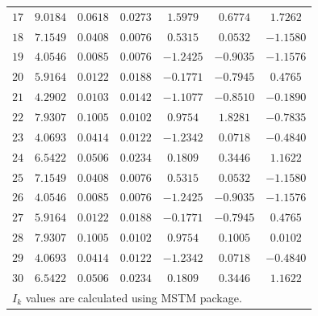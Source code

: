 \documentclass[final, 3p]{elsarticle}
\begin{document}
\begin{table}[h]
\begin{center}
\begin{tabular}{|c|c|c|c|c|c|c|}
$17$ & $9.0184$ & $0.0618$ & $0.0273$ & $ 1.5979$ & $ 0.6774$ & $ 1.7262$ \\
$18$ & $7.1549$ & $0.0408$ & $0.0076$ & $ 0.5315$ & $ 0.0532$ & $-1.1580$ \\
$19$ & $4.0546$ & $0.0085$ & $0.0076$ & $-1.2425$ & $-0.9035$ & $-1.1576$ \\
$20$ & $5.9164$ & $0.0122$ & $0.0188$ & $-0.1771$ & $-0.7945$ & $ 0.4765$ \\
$21$ & $4.2902$ & $0.0103$ & $0.0142$ & $-1.1077$ & $-0.8510$ & $-0.1890$ \\
$22$ & $7.9307$ & $0.1005$ & $0.0102$ & $ 0.9754$ & $ 1.8281$ & $-0.7835$ \\
$23$ & $4.0693$ & $0.0414$ & $0.0122$ & $-1.2342$ & $ 0.0718$ & $-0.4840$ \\
$24$ & $6.5422$ & $0.0506$ & $0.0234$ & $ 0.1809$ & $ 0.3446$ & $ 1.1622$ \\
$25$ & $7.1549$ & $0.0408$ & $0.0076$ & $ 0.5315$ & $ 0.0532$ & $-1.1580$ \\
$26$ & $4.0546$ & $0.0085$ & $0.0076$ & $-1.2425$ & $-0.9035$ & $-1.1576$ \\
$27$ & $5.9164$ & $0.0122$ & $0.0188$ & $-0.1771$ & $-0.7945$ & $ 0.4765$ \\
$28$ & $7.9307$ & $0.1005$ & $0.0102$ & $ 0.9754$ & $ 0.1005$ & $ 0.0102$ \\
$29$ & $4.0693$ & $0.0414$ & $0.0122$ & $-1.2342$ & $ 0.0718$ & $-0.4840$ \\
$30$ & $6.5422$ & $0.0506$ & $0.0234$ & $ 0.1809$ & $ 0.3446$ & $ 1.1622$ \\
\hline\hline
\multicolumn{7}{l}{\small *$I_k$ values are calculated using MSTM package.}
\end{tabular}
\end{center}
\label{sec:App2}
\end{table}


\end{document}

